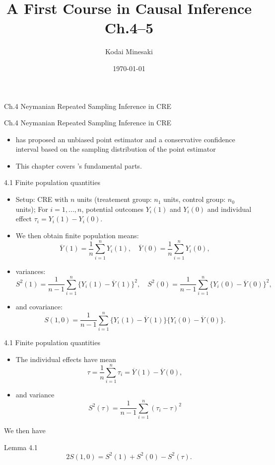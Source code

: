\documentclass[aspectratio=169, 12pt]{beamer}
\title[]{A First Course in Causal Inference Ch.4--5}
\author[Kodai Minesaki]{Kodai Minesaki}
\institute[Faculty of Engineering, The University of Tokyo]{Faculty of Engineering, The University of Tokyo}
\date{\today}
\begin{document}
\begin{frame}
\titlepage
\end{frame}

\begin{frame}
  
  {
    \large
    
    Ch.4 Neymanian Repeated Sampling Inference in CRE
  }

\end{frame}

\begin{frame}{Ch.4 Neymanian Repeated Sampling Inference in CRE}
  \begin{itemize}
    \item \citet{neyman1923application} has proposed an unbiased point estimator and a conservative confidence interval based on the sampling distribution of the point estimator
    \item This chapter covers \citet{neyman1923application}'s fundamental parts.
  \end{itemize}
\end{frame}

\begin{frame}{4.1 Finite population quantities}
  \begin{itemize}
    \item Setup: CRE with $n$ units (treatement group: $n_1$ units, control group: $n_0$ units); For $i=1,...,n$, potential outcomes $Y_i(1)$ and $Y_i(0)$ and individual effect $\tau_i = Y_i(1)-Y_i(0)$.
    \item We then obtain finite population means:
    \[
    \overline{Y}(1) = \frac{1}{n}\sum_{i=1}^{n}Y_i(1), \quad \overline{Y}(0) = \frac{1}{n}\sum_{i=1}^{n}Y_i(0),
    \]
    \item variances:
    \[
    S^2(1) = \frac{1}{n-1}\sum_{i=1}^{n}\{Y_i(1)-\overline{Y}(1)\}^2, \quad S^2(0) = \frac{1}{n-1}\sum_{i=1}^{n}\{Y_i(0)-\overline{Y}(0)\}^2,
    \]
    \item and covariance:
    \[
    S(1,0) = \frac{1}{n-1}\sum_{i=1}^{n}\{Y_i(1)-\overline{Y}(1)\}\{Y_i(0)-\overline{Y}(0)\}.
    \]
  \end{itemize}
\end{frame}

\begin{frame}{4.1 Finite population quantities}
  \begin{itemize}
    \item The individual effects have mean
    \[
    \tau = \frac{1}{n}\sum_{i=1}^{n}\tau_i = \overline{Y}(1)-\overline{Y}(0), 
    \]
    \item and variance
    \[
    S^2(\tau) = \frac{1}{n-1}\sum_{i=1}^{n}(\tau_i-\tau)^2
    \]
  \end{itemize}
  We then have
  \begin{keybox}{Lemma 4.1}
    \[
    2S(1,0) = S^2(1)+S^2(0) - S^2(\tau).
    \]
  \end{keybox}
\end{frame}
\end{document}
